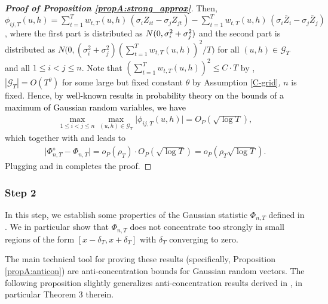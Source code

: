 \documentclass[a4paper,12pt]{article}
\makeatletter
\renewcommand{\eqref}[1]{\tagform@{\ref{#1}}}
\makeatother
\begin{document}
\begin{proof}[\textnormal{\textbf{Proof of Proposition \ref{propA:strong_approx}}}]
Then, $\phi_{ij, T}(u,h) = \sum\nolimits_{t=1}^T w_{t,T}(u,h) \, (\sigma_i Z_{it} - \sigma_j Z_{jt}) - \sum\nolimits_{t=1}^T w_{t,T}(u,h) \, ( \sigma_i \bar{Z}_i - \sigma_j \bar{Z}_j)$, where the first part is distributed as $ N(0,{\sigma}^2_i + {\sigma}^2_j)$ and the second part is distributed as $N\Big(0, (\sigma_i^2 + \sigma_j^2)(\sum_{t=1}^T w_{t, T}(u, h))^2/T\Big)$ for all $(u,h) \in \mathcal{G}_T$ and all $1\le i < j \le n$. Note that $(\sum_{t=1}^T w_{t, T}(u, h))^2 \leq C \cdot T$ by \eqref{ineq-diff-13},  $|\mathcal{G}_T| = O(T^\theta)$ for some large but fixed constant $\theta$ by Assumption \ref{C-grid}, $n$ is fixed. Hence, \textcolor{black}{by well-known results in probability theory on the bounds of a maximum of Gaussian random variables, we have}
\begin{align}\label{eqA:strong_approx:bound7}
\max_{1\leq i< j \leq n}\max_{(u,h) \in \mathcal{G}_T} \big|\phi_{ij, T}(u,h)\big| = O_P(\sqrt{\log T}),
\end{align}
which together with \eqref{eqA:strong_approx:bound5} and \eqref{eqA:strong_approx:bound6} leads to
\begin{align}\label{eq-strongapprox-bound5}
\big| \Phi_{n, T}^{\diamond} - \Phi_{n, T} \big| = o_P(\rho_T) \cdot O_P(\sqrt{\log T})= o_P(\rho_T \sqrt{\log T}).
\end{align}
Plugging \eqref{eq-strongapprox-bound4} and \eqref{eq-strongapprox-bound5} in \eqref{eq-strongapprox-bound1} completes the proof.
\end{proof}




\subsubsection*{Step 2}


In this step, we establish some properties of the Gaussian statistic $\Phi_{n,T}$ defined in \eqref{eq:Phi}. We in particular show that $\Phi_{n,T}$ does not concentrate too strongly in small regions of the form $[x-\delta_T,x+\delta_T]$ with $\delta_T$ converging to zero.  

The main technical tool for proving these results (specifically, Proposition \ref{propA:anticon}) are anti-concentration bounds for Gaussian random vectors. The following proposition slightly generalizes anti-concentration results derived in \cite{Chernozhukov2015}, in particular Theorem 3 therein.
\end{document}
